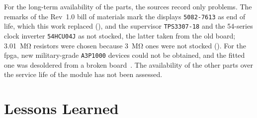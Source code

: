 For the long-term availability of the parts, the sources record only problems. The remarks of the Rev~1.0 bill of materials mark the displays \texttt{5082-7613} as end of life, which this work replaced (), and the supervisor \texttt{TPS3307-18} and the 54-series clock inverter \texttt{54HCU04J} as not stocked, the latter taken from the old board; \SI{3.01}{\mega\ohm} resistors were chosen because \SI{3}{\mega\ohm} ones were not stocked (). For the \gls{fpga}, new military-grade \texttt{A3P1000} devices could not be obtained, and the fitted one was desoldered from a broken board~\cite[Sec.~6.2]{leyer2023}. The availability of the other parts over the service life of the module has not been assessed.

\section{Lessons Learned}
\label{sec:lessons_learned}

